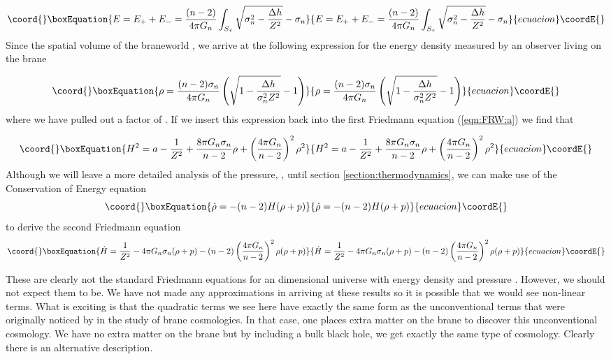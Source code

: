 \documentclass[a4paper,12pt]{article}
\begin{document}
\begin{equation}\coord{}\boxEquation{ \label{eqn:energy}
E=E_++E_-= \frac{(n-2)}{4 \pi G_n} \int_{S_{\tau}}
\sqrt{\sigma_n^2-\frac{\Delta h}{Z^2}} -\sigma_n
}{ E=E_++E_-= \frac{(n-2)}{4 \pi G_n} \int_{S_{\tau}}
\sqrt{\sigma_n^2-\frac{\Delta h}{Z^2}} -\sigma_n
}{ecuacion}\coordE{}\end{equation}
Since the spatial volume of the braneworld
\coordHE{}, we arrive at the following
expression for the energy density measured by an observer living on
the brane

\begin{equation}\coord{}\boxEquation{ \label{eqn:rho}
\rho= \frac{(n-2)\sigma_n}{4 \pi G_n} \left( \sqrt{1-\frac{\Delta
h}{\sigma_n^2Z^2}} -1 \right)
}{ \rho= \frac{(n-2)\sigma_n}{4 \pi G_n} \left( \sqrt{1-\frac{\Delta
h}{\sigma_n^2Z^2}} -1 \right)
}{ecuacion}\coordE{}\end{equation}
where we have pulled out a factor of \coordHE{}. If we insert this
expression back into the first Friedmann equation (\ref{eqn:FRW:a}) we
find that

\begin{equation}\coord{}\boxEquation{ \label{eqn:FRWft:a}
H^2= a - \frac{1}{Z^2} + \frac{8 \pi G_n \sigma_n}{n-2} \rho + \left (
\frac{4 \pi G_n}{n-2} \right)^2 \rho^2
}{ H^2= a - \frac{1}{Z^2} + \frac{8 \pi G_n \sigma_n}{n-2} \rho + \left (
\frac{4 \pi G_n}{n-2} \right)^2 \rho^2
}{ecuacion}\coordE{}\end{equation}
Although we will leave a more detailed analysis of the pressure, \coordHE{},
until section \ref{section:thermodynamics}, we can make use of the
Conservation of Energy equation
\begin{equation}\coord{}\boxEquation{
\dot{\rho}=-(n-2)H(\rho+p)
}{
\dot{\rho}=-(n-2)H(\rho+p)
}{ecuacion}\coordE{}\end{equation}
to derive the second Friedmann equation
\begin{equation}\coord{}\boxEquation{ \label{eqn:FRWft:b}
\dot{H}=\frac{1}{Z^2}-4 \pi G_n \sigma_n (\rho+p) -(n-2)\left (
\frac{4 \pi G_n}{n-2} \right)^2\rho  (\rho+p)
}{ \dot{H}=\frac{1}{Z^2}-4 \pi G_n \sigma_n (\rho+p) -(n-2)\left (
\frac{4 \pi G_n}{n-2} \right)^2\rho  (\rho+p)
}{ecuacion}\coordE{}\end{equation}

These are clearly not the standard Friedmann equations for an \coordHE{}
dimensional universe with energy density \myHighlight{$\rho$}\coordHE{} and pressure
\coordHE{}. However, we should not expect them to be. We have not made any
approximations in arriving at these results so it is possible that we
would see non-linear terms. What is exciting is that the quadratic
terms we see here have exactly the same form as the unconventional
terms that were originally noticed by
\cite{Binetruy:branecos1,Binetruy:branecos2} in the study of brane
cosmologies. In that case, one places extra matter on the brane to
discover this unconventional cosmology. We have no extra matter on the
brane but by including a bulk black hole, we get exactly the same type
of cosmology. Clearly there is an alternative description.
\end{document}
